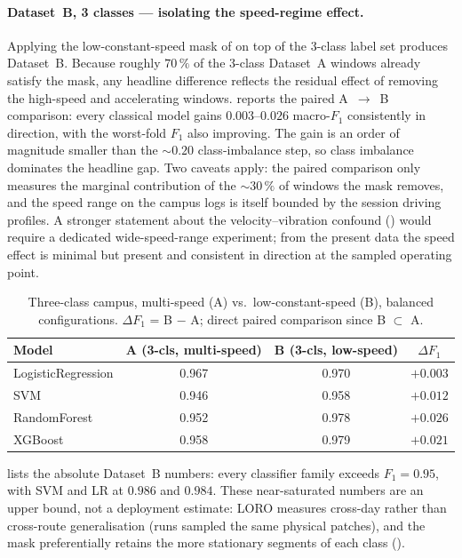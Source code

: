 \paragraph{Dataset~B, 3 classes --- isolating the speed-regime effect.} Applying the low-constant-speed mask of  on top of the 3-class label set produces Dataset~B. Because roughly $70\,\%$ of the 3-class Dataset~A windows already satisfy the mask, any headline difference reflects the residual effect of removing the high-speed and accelerating windows.  reports the paired A~$\to$~B comparison: every classical model gains $0.003$--$0.026$ macro-$F_1$ consistently in direction, with the worst-fold $F_1$ also improving. The gain is an order of magnitude smaller than the $\sim 0.20$ class-imbalance step, so class imbalance dominates the headline gap. Two caveats apply: the paired comparison only measures the marginal contribution of the $\sim 30\,\%$ of windows the mask removes, and the speed range on the campus logs is itself bounded by the session driving profiles. A stronger statement about the velocity--vibration confound () would require a dedicated wide-speed-range experiment; from the present data the speed effect is minimal but present and consistent in direction at the sampled operating point.

\vspace{-4mm}
\begin{table}[H]
\centering
\caption{Three-class campus, multi-speed (A) vs.\ low-constant-speed (B), balanced configurations. $\Delta F_1$ = B $-$ A; direct paired comparison since B $\subset$ A.}
\label{tab:campus_A3_vs_B3}
\begin{tabular}{lccc}
\toprule
\textbf{Model} & \textbf{A (3-cls, multi-speed)} & \textbf{B (3-cls, low-speed)} & $\Delta F_1$ \\
\midrule
LogisticRegression & 0.967 & 0.970 & $+0.003$ \\
SVM                & 0.946 & 0.958 & $+0.012$ \\
RandomForest       & 0.952 & 0.978 & $+0.026$ \\
XGBoost            & 0.958 & 0.979 & $+0.021$ \\
\bottomrule
\end{tabular}
\end{table}

 lists the absolute Dataset~B numbers: every classifier family exceeds $F_1 = 0.95$, with SVM and LR at $0.986$ and $0.984$. These near-saturated numbers are an upper bound, not a deployment estimate: LORO measures cross-day rather than cross-route generalisation (runs sampled the same physical patches), and the mask preferentially retains the more stationary segments of each class ().


